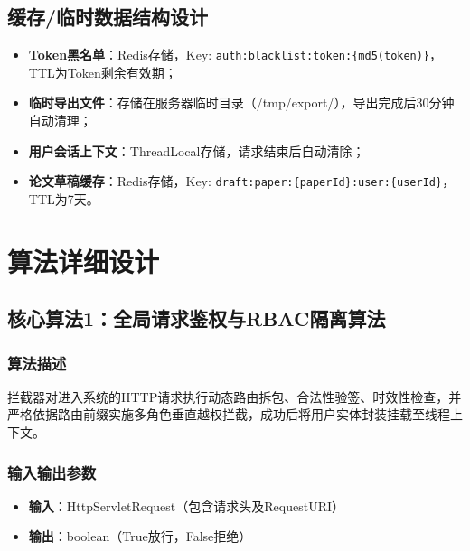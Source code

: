 \documentclass{../template/softeng}
\begin{document}
	\subsection{缓存/临时数据结构设计}
	\begin{itemize}
		\item \textbf{Token黑名单}：Redis存储，Key: \texttt{auth:blacklist:token:\{md5(token)\}}，TTL为Token剩余有效期；
		\item \textbf{临时导出文件}：存储在服务器临时目录（/tmp/export/），导出完成后30分钟自动清理；
		\item \textbf{用户会话上下文}：ThreadLocal存储，请求结束后自动清除；
		\item \textbf{论文草稿缓存}：Redis存储，Key: \texttt{draft:paper:\{paperId\}:user:\{userId\}}，TTL为7天。
	\end{itemize}


	\section{算法详细设计}

	\subsection{核心算法1：全局请求鉴权与RBAC隔离算法}

	\subsubsection{算法描述}
	拦截器对进入系统的HTTP请求执行动态路由拆包、合法性验签、时效性检查，并严格依据路由前缀实施多角色垂直越权拦截，成功后将用户实体封装挂载至线程上下文。

	\subsubsection{输入输出参数}
	\begin{itemize}
		\item \textbf{输入}：HttpServletRequest（包含请求头及RequestURI）
		\item \textbf{输出}：boolean（True放行，False拒绝）
	\end{itemize}
\end{document}
